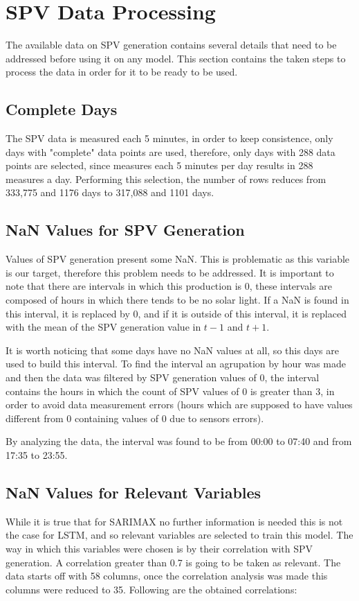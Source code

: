 \documentclass[a4paper,12pt]{article}
\begin{document}
\section{SPV Data Processing}
The available data on SPV generation contains several details that need to be addressed before using it on any model. This section contains the taken steps to process the data in order for it to be ready to be used.

\subsection{Complete Days}

The SPV data is measured each 5 minutes, in order to keep consistence, only days with "complete" data points are used, therefore, only days with 288 data points are selected, since measures each 5 minutes per day results in 288 measures a day. Performing this selection, the number of rows reduces from 333,775 and 1176 days to 317,088 and 1101 days.

\subsection{NaN Values for SPV Generation}
Values of SPV generation present some NaN. This is problematic as this variable is our target, therefore this problem needs to be addressed. It is important to note that there are intervals in which this production is 0, these intervals are composed of hours in which there tends to be no solar light. If a NaN is found in this interval, it is replaced by 0, and if it is outside of this interval, it is replaced with the mean of the SPV generation value in \(t-1\) and \(t+1\). 

It is worth noticing that some days have no NaN values at all, so this days are used to build this interval. To find the interval an agrupation by hour was made and then the data was filtered by SPV generation values of 0, the interval contains the hours in which the count of SPV values of 0 is greater than 3, in order to avoid data measurement errors (hours which are supposed to have values different from 0 containing values of 0 due to sensors errors).

By analyzing the data, the interval was found to be from 00:00 to 07:40 and from 17:35 to 23:55.

\subsection{NaN Values for Relevant Variables}
While it is true that for SARIMAX no further information is needed this is not the case for LSTM, and so relevant variables are selected to train this model. The way in which this variables were chosen is by their correlation with SPV generation. A correlation greater than 0.7 is going to be taken as relevant. The data starts off with 58 columns, once the correlation analysis was made this columns were reduced to 35. Following are the obtained correlations:
\end{document}
